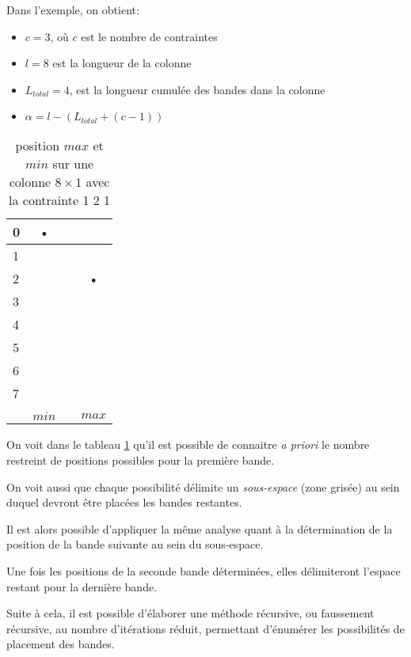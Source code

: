 \documentclass[a4paper,12pt]{report}
\newcommand\black{\cellcolor{black}}
\newcommand\grey{\cellcolor{black!50}}
\begin{document}
Dans l'exemple, on obtient:
\begin{itemize}
\item[] $c = 3$, où $c$ est le nombre de contraintes
\item[] $l = 8$ est la longueur de la colonne
\item[] $L_{total} = 4$, est la longueur cumulée des bandes dans la colonne
\item[] $\alpha = l-(L_{total}+(c-1))$
\end{itemize}

\begin{table}[H]
\centering
\begin{tabular}{|l||c|c|c|}
\hline 
0&\black• &  &  \\ 
\hline 
1 & &  &  \\ 
\hline 
2 & \grey &  & \black• \\ 
\hline 
3&\grey &  & \\ 
\hline 
4&\grey &  & \grey \\ 
\hline 
5&\grey &  & \grey \\ 
\hline 
6&\grey &  & \grey \\ 
\hline 
7&\grey &  & \grey \\ 
\hline &&\\
[-1.3em]\hline
&$min$ &  & $max$ \\ 
\hline 
\end{tabular} 
\caption{\label{bande8X1} position $max$ et $min$ sur une colonne $8\times1$ avec la contrainte 1 2 1}
\end{table}


On voit dans le tableau \ref{bande8X1} qu'il est possible de connaitre \textit{a priori} le nombre restreint de positions possibles pour la première bande. 

On voit aussi que chaque possibilité délimite un \textit{sous-espace} (zone grisée) au sein duquel devront être placées les bandes restantes.

Il est alors possible d'appliquer la même analyse quant à la détermination de la position de la bande suivante au sein du sous-espace.

Une fois les positions de la seconde bande déterminées, elles délimiteront l'espace restant pour la dernière bande. 

Suite à cela, il est possible d'élaborer une méthode récursive, ou faussement récursive, au nombre d'itérations réduit, permettant d'énumérer les possibilités de placement des bandes.
\end{document}
